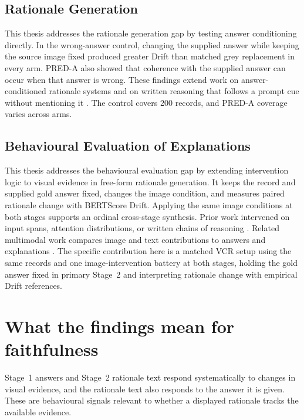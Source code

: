 \subsection{Rationale Generation}
\label{sec:discussion-priorwork-rationales}

This thesis addresses the rationale generation gap by testing answer
conditioning directly. In the wrong-answer control, changing the supplied answer
while keeping the source image fixed produced greater Drift than matched grey
replacement in every arm. PRED-A also showed that coherence with the supplied
answer can occur when that answer is wrong. These findings extend work on
answer-conditioned rationale systems
\citep{DBLP:conf/cvpr/ParkHARSDR18,DBLP:conf/emnlp/MarasovicBPLSC20}
and on written reasoning that follows a prompt cue without mentioning it
\citep{DBLP:conf/nips/TurpinMPB23}. The control covers 200 records, and PRED-A
coverage varies across arms.

\subsection{Behavioural Evaluation of Explanations}
\label{sec:discussion-priorwork-behavioural}

This thesis addresses the behavioural evaluation gap by extending intervention
logic to visual evidence in free-form rationale generation. It keeps the record
and supplied gold answer fixed, changes the image condition, and measures paired
rationale change with BERTScore Drift. Applying the same image conditions at
both stages supports an ordinal cross-stage synthesis. Prior work intervened on
input spans, attention distributions, or written chains of reasoning
\citep{DeYoungEtAl20ERASER,JainWallace19Attention,DBLP:journals/corr/abs-2307-13702}.
Related multimodal work compares image and text contributions to answers and
explanations \citep{ParcalabescuFrank25VLM}. The specific contribution here is a
matched VCR setup using the same records and one image-intervention battery at
both stages, holding the gold answer fixed in primary Stage~2 and interpreting
rationale change with empirical Drift references.

\section{What the findings mean for faithfulness}
\label{sec:discussion-faithfulness}

\enlargethispage{-4\baselineskip}
Stage~1 answers and Stage~2 rationale text respond systematically to changes in
visual evidence, and the rationale text also responds to the answer it is given.
These are behavioural signals relevant to whether a displayed rationale tracks
the available evidence.

